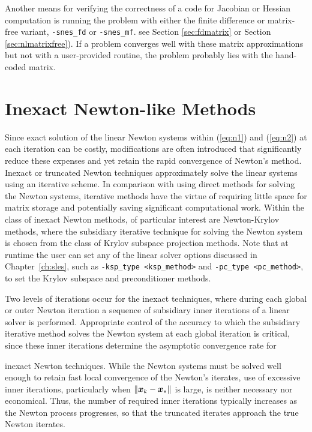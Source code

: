 Another means for verifying the correctness of a code for Jacobian or
Hessian computation is running the problem with either the finite
difference or matrix-free variant, {\tt -snes\_fd} or {\tt -snes\_mf}.
see Section \ref{sec:fdmatrix} or Section \ref{sec:nlmatrixfree}). 
If a problem converges well
with these matrix approximations but not with a user-provided routine,
the problem probably lies with the hand-coded
matrix.  

\section{Inexact Newton-like Methods}

Since exact solution of the linear Newton systems within (\ref{eq:n1}) 
and (\ref{eq:n2}) at each iteration can be costly, modifications 
are often introduced that significantly reduce these expenses and 
yet retain the rapid convergence of Newton's method.  Inexact or 
truncated Newton techniques approximately solve the linear systems 
using an iterative scheme.  In comparison with using direct methods 
for solving the Newton systems, iterative methods have the virtue 
of requiring little space for matrix storage and potentially saving 
significant computational work.  Within the class of inexact Newton 
methods, of particular interest are Newton-Krylov methods, where the 
subsidiary iterative technique for solving the Newton system is 
chosen from the class of Krylov subspace projection methods. 
Note that at runtime the user can set any of the linear solver
options discussed in Chapter~\ref{ch:sles}, such as 
{\tt -ksp\_type <ksp\_method>} and {\tt -pc\_type <pc\_method>},
to set the Krylov subspace and preconditioner methods.

Two levels of iterations occur for the inexact techniques, where 
during each global or outer Newton iteration a sequence of 
subsidiary inner iterations of a linear solver is performed.
Appropriate control of the accuracy to which the subsidiary 
iterative method solves the Newton system
at each global iteration is critical, since these 
inner iterations determine the asymptotic convergence rate for 

inexact Newton techniques.
While the Newton systems must be solved well enough to retain
fast local convergence of the Newton's iterates, use of excessive
inner iterations, particularly when $\| \mbox{\boldmath \(x\)}_k - \mbox{\boldmath \(x\)}_* \|$ is large,
is neither necessary nor economical.
Thus, the number of required inner iterations typically increases
as the Newton process progresses, so that the truncated iterates
approach the true Newton iterates.

